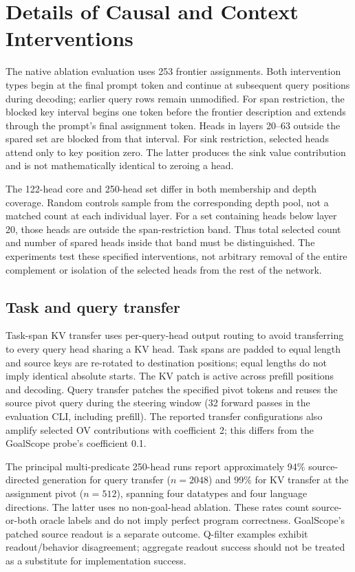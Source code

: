 \section{Details of Causal and Context Interventions}
\label{app:ablation}
The native ablation evaluation uses 253 frontier assignments. Both intervention types begin at the final prompt token and continue at subsequent query positions during decoding; earlier query rows remain unmodified. For span restriction, the blocked key interval begins one token before the frontier description and extends through the prompt's final assignment token. Heads in layers 20--63 outside the spared set are blocked from that interval. For sink restriction, selected heads attend only to key position zero. The latter produces the sink value contribution and is not mathematically identical to zeroing a head.

The 122-head core and 250-head set differ in both membership and depth coverage. Random controls sample from the corresponding depth pool, not a matched count at each individual layer. For a set containing heads below layer 20, those heads are outside the span-restriction band. Thus total selected count and number of spared heads inside that band must be distinguished. The experiments test these specified interventions, not arbitrary removal of the entire complement or isolation of the selected heads from the rest of the network.

\subsection{Task and query transfer}
\label{app:task_transfer}
Task-span KV transfer uses per-query-head output routing to avoid transferring to every query head sharing a KV head. Task spans are padded to equal length and source keys are re-rotated to destination positions; equal lengths do not imply identical absolute starts. The KV patch is active across prefill positions and decoding. Query transfer patches the specified pivot tokens and reuses the source pivot query during the steering window (32 forward passes in the evaluation CLI, including prefill). The reported transfer configurations also amplify selected OV contributions with coefficient 2; this differs from the GoalScope probe's coefficient 0.1.

The principal multi-predicate 250-head runs report approximately 94\% source-directed generation for query transfer ($n=2048$) and 99\% for KV transfer at the assignment pivot ($n=512$), spanning four datatypes and four language directions. The latter uses no non-goal-head ablation. These rates count source-or-both oracle labels and do not imply perfect program correctness. GoalScope's patched source readout is a separate outcome. Q-filter examples exhibit readout/behavior disagreement; aggregate readout success should not be treated as a substitute for implementation success.


